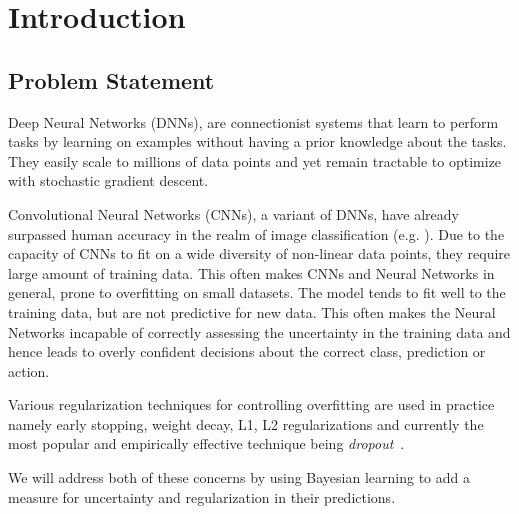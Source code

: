 
\chapter{Introduction}  %

\ifpdf
    \graphicspath{{Chapter1/Figs/Raster/}{Chapter1/Figs/PDF/}{Chapter1/Figs/}}
\else
    \graphicspath{{Chapter1/Figs/Vector/}{Chapter1/Figs/}}
\fi



\section{Problem Statement}

Deep Neural Networks (DNNs), are connectionist systems that learn to perform tasks by learning on examples without having a prior knowledge about the tasks. 
They easily scale to millions of data points and yet remain tractable to optimize with stochastic gradient descent.

Convolutional Neural Networks (CNNs), a variant of DNNs, have already surpassed human accuracy in the realm of image classification (e.g. \cite{he2016deep,simonyan2014very,krizhevsky2012imagenet}). Due to the capacity of CNNs to fit on a wide diversity of non-linear data points, they require large amount of training data. This often makes CNNs and Neural Networks in general, prone to overfitting on small datasets. The model tends to fit well to the training data, but are not predictive for new data. This often makes the Neural Networks incapable of correctly assessing the uncertainty in the training data and hence leads to overly confident decisions about the correct class, prediction or action.

Various regularization techniques for controlling overfitting are used in practice namely  early stopping, weight decay, L1, L2 regularizations and currently the most popular and empirically effective technique being \emph{dropout}~\cite{hinton2012improving}. 

We will address both of these concerns by using Bayesian learning to add a measure for uncertainty and regularization in their predictions. 

